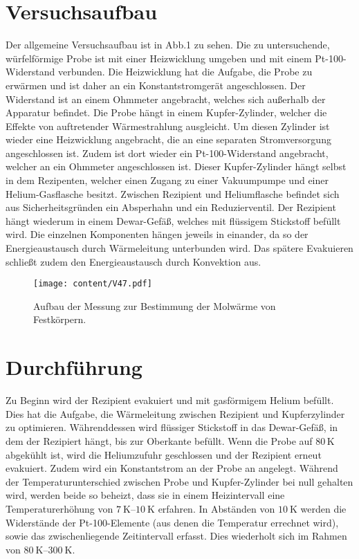 \newpage

\section{Versuchsaufbau}
Der allgemeine Versuchsaufbau ist in Abb.1 zu sehen. Die zu untersuchende, würfelförmige
Probe ist mit einer Heizwicklung umgeben und mit einem Pt-100-Widerstand verbunden. Die
Heizwicklung hat die Aufgabe, die Probe zu erwärmen und ist daher an ein Konstantstromgerät
angeschlossen. Der Widerstand ist an einem Ohmmeter angebracht, welches sich außerhalb der
Apparatur befindet. Die Probe hängt in einem Kupfer-Zylinder, welcher die Effekte von
auftretender Wärmestrahlung ausgleicht. Um diesen Zylinder ist wieder eine Heizwicklung
angebracht, die an eine separaten Stromversorgung angeschlossen ist. Zudem ist dort wieder
ein Pt-100-Widerstand angebracht, welcher an ein Ohmmeter angeschlossen ist. Dieser
Kupfer-Zylinder hängt selbst in dem Rezipenten, welcher einen
Zugang zu einer Vakuumpumpe und einer Helium-Gasflasche besitzt. Zwischen Rezipient und
Heliumflasche befindet sich aus Sicherheitsgründen ein Absperhahn und ein Reduzierventil.
Der Rezipient hängt wiederum in einem Dewar-Gefäß, welches mit flüssigem Stickstoff befüllt
wird. Die einzelnen Komponenten hängen jeweils in einander, da so der Energieaustausch durch
Wärmeleitung unterbunden wird. Das spätere Evakuieren schließt zudem den Energieaustausch
durch Konvektion aus.
\begin{figure}[h!]
 \centering
 \texttt{[image: content/V47.pdf]}
 \caption{Aufbau der Messung zur Bestimmung der Molwärme von Festkörpern. \cite{anleitung}}
 \label{fig:Versuchsaufbau1}
\end{figure}
\FloatBarrier

\section{Durchführung}
\label{sec:Durchführung}
Zu Beginn wird der Rezipient evakuiert und mit gasförmigem Helium befüllt.
Dies hat die Aufgabe, die Wärmeleitung zwischen Rezipient und Kupferzylinder zu optimieren.
Währenddessen wird flüssiger Stickstoff in das Dewar-Gefäß, in dem der Rezipiert
hängt, bis zur Oberkante befüllt. Wenn die Probe auf 80$\,$K abgekühlt ist, wird die Heliumzufuhr
geschlossen und der Rezipient erneut evakuiert. Zudem wird ein
Konstantstrom an der Probe an angelegt. Während der Temperaturunterschied zwischen
Probe und Kupfer-Zylinder bei null gehalten wird, werden beide so beheizt, dass sie in einem
Heizintervall eine Temperaturerhöhung von $\SIrange{7}{10}{\kelvin}$ erfahren. In Abständen von
$\SI{10}{\kelvin}$ werden die Widerstände der Pt-100-Elemente (aus denen die Temperatur errechnet wird),
sowie das zwischenliegende Zeitintervall erfasst. Dies wiederholt sich im Rahmen von $\SIrange{80}{300}{\kelvin}$.
